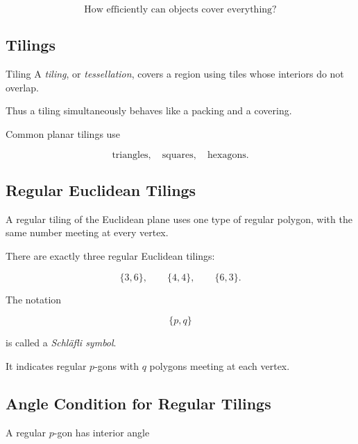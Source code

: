 \[
\boxed{
\text{How efficiently can objects cover everything?}
}
\]

\subsection{Tilings}
\label{subsec:geometric-tilings}

\begin{definitionbox}{Tiling}
A \emph{tiling}, or \emph{tessellation}, covers a region using tiles whose
interiors do not overlap.
\end{definitionbox}

Thus a tiling simultaneously behaves like a packing and a covering.

Common planar tilings use

\[
\boxed{
\text{triangles},
\quad
\text{squares},
\quad
\text{hexagons}.
}
\]

\subsection{Regular Euclidean Tilings}
\label{subsec:regular-euclidean-tilings}

A regular tiling of the Euclidean plane uses one type of regular polygon,
with the same number meeting at every vertex.

There are exactly three regular Euclidean tilings:

\[
\boxed{
\{3,6\},
\qquad
\{4,4\},
\qquad
\{6,3\}.
}
\]

The notation

\[
\{p,q\}
\]

is called a \emph{Schl\"afli symbol}.

It indicates regular \(p\)-gons with \(q\) polygons meeting at each vertex.

\subsection{Angle Condition for Regular Tilings}
\label{subsec:regular-tiling-angle-condition}

A regular \(p\)-gon has interior angle

